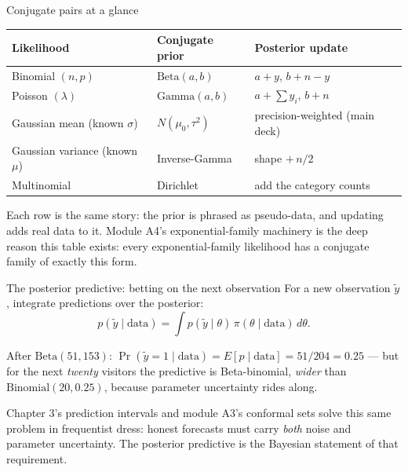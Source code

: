 \documentclass[aspectratio=169,11pt]{beamer}
\begin{document}
\begin{frame}{Conjugate pairs at a glance}
  \footnotesize
  \begin{center}
  \begin{tabular}{@{}lll@{}}
    \toprule
    \textbf{Likelihood} & \textbf{Conjugate prior} & \textbf{Posterior update} \\
    \midrule
    Binomial $(n, p)$ & $\text{Beta}(a, b)$ & $a{+}y$, $b{+}n{-}y$ \\
    Poisson $(\lambda)$ & $\text{Gamma}(a, b)$ & $a + \textstyle\sum y_i$, $b + n$ \\
    Gaussian mean (known $\sigma$) & $N(\mu_0, \tau^2)$ & precision-weighted
      (main deck) \\
    Gaussian variance (known $\mu$) & Inverse-Gamma & shape ${+}\,n/2$ \\
    Multinomial & Dirichlet & add the category counts \\
    \bottomrule
  \end{tabular}
  \end{center}
  \begin{readme}
    Each row is the same story: the prior is phrased as pseudo-data, and updating
    adds real data to it. Module A4's exponential-family machinery is the deep
    reason this table exists: every exponential-family likelihood has a conjugate
    family of exactly this form.
  \end{readme}
\end{frame}

\begin{frame}{The posterior predictive: betting on the next observation}
  \footnotesize
  For a new observation $\tilde y$, integrate predictions over the posterior:
  \[
    p(\tilde y \mid \text{data})
      = \int p(\tilde y \mid \theta)\,\pi(\theta \mid \text{data})\, d\theta .
  \]
  \begin{numexample}
    After $\text{Beta}(51, 153)$: $\Pr(\tilde y = 1 \mid \text{data}) =
    E[p \mid \text{data}] = 51/204 = 0.25$ --- but for the next \emph{twenty}
    visitors the predictive is Beta-binomial, \emph{wider} than
    $\text{Binomial}(20, 0.25)$, because parameter uncertainty rides along.
  \end{numexample}
  \begin{takeaway}
    Chapter 3's prediction intervals and module A3's conformal sets solve this
    same problem in frequentist dress: honest forecasts must carry \emph{both}
    noise and parameter uncertainty. The posterior predictive is the Bayesian
    statement of that requirement.
  \end{takeaway}
\end{frame}
\end{document}
